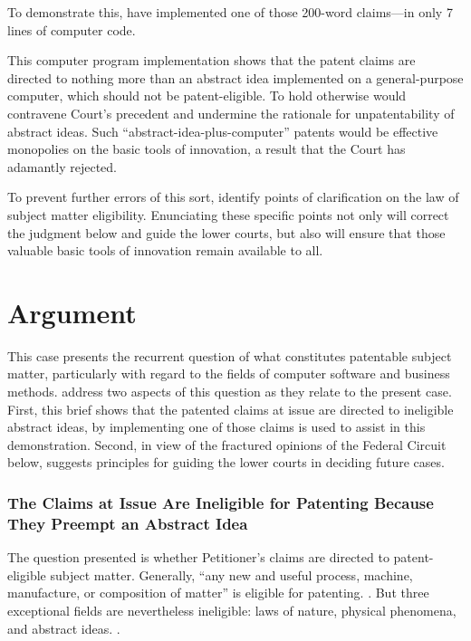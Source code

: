 \documentclass{scotus}
\begin{document}
To demonstrate this, \amici have implemented one of those 200-word
claims---in only 7 lines of computer code.

This computer program implementation shows that the patent
claims are directed to nothing more than an abstract idea implemented on a
general-purpose computer, which should not be patent-eligible.
%
To hold otherwise would contravene
Court's precedent and undermine the rationale for unpatentability of
abstract ideas. Such ``abstract-idea-plus-computer'' patents would be effective
monopolies on the basic tools of innovation, a result that the
Court has adamantly rejected.

To prevent further errors of this sort, \amici identify points of clarification
on the law of subject matter eligibility. Enunciating these specific points not
only will correct the judgment below and guide the lower courts, but also will
ensure that those valuable basic tools of innovation remain available to all.

\part{Argument}

This case presents the recurrent question of what constitutes patentable
subject matter, particularly with regard to the fields of computer software and
business methods. \Amici address two aspects of this question as they relate to
the present case. First, this brief shows that the patented claims at issue are
directed to ineligible abstract ideas, by
implementing one of those claims is used to assist in this demonstration.
Second, in view of the fractured opinions of the Federal Circuit below, \amici
suggests principles for guiding the lower courts in deciding future cases.



%
%
\section{The Claims at Issue Are Ineligible for Patenting Because They
Preempt an Abstract Idea}

The question presented is whether Petitioner's claims are directed to
patent-eligible subject matter. Generally, ``any new and
useful process, machine, manufacture, or composition of matter'' is eligible for
patenting. . But three exceptional fields
are nevertheless ineligible: laws of nature, physical phenomena, and abstract
ideas. .
\end{document}
